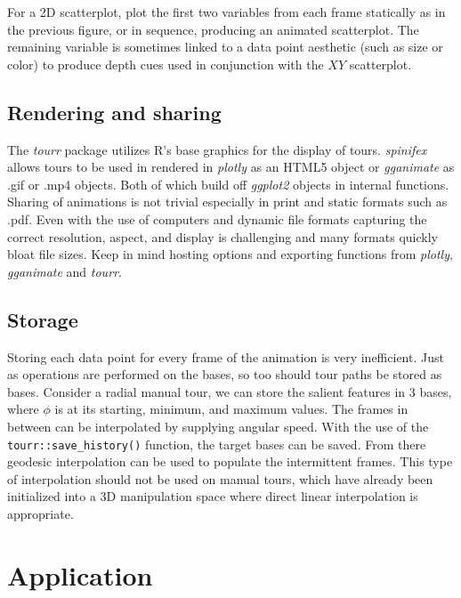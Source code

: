 \documentclass{monashthesis}
\theoremstyle{definition}
\theoremstyle{definition}
\theoremstyle{definition}
\theoremstyle{remark}
\begin{document}
For a 2D scatterplot, plot the first two variables from each frame
statically as in the previous figure, or in sequence, producing an
animated scatterplot. The remaining variable is sometimes linked to a
data point aesthetic (such as size or color) to produce depth cues used
in conjunction with the \(XY\) scatterplot.

\subsection{Rendering and sharing}\label{rendering-and-sharing}

The \emph{tourr} package utilizes R's base graphics for the display of
tours. \emph{spinifex} allows tours to be used in rendered in
\emph{plotly} \textcite{sievert_plotly_2018} as an HTML5 object or
\emph{gganimate} \textcite{pedersen_gganimate:_2019} as .gif or .mp4
objects. Both of which build off \emph{ggplot2} objects in internal
functions. Sharing of animations is not trivial especially in print and
static formats such as .pdf. Even with the use of computers and dynamic
file formats capturing the correct resolution, aspect, and display is
challenging and many formats quickly bloat file sizes. Keep in mind
hosting options and exporting functions from \emph{plotly},
\emph{gganimate} and \emph{tourr}.

\subsection{Storage}\label{storage}

Storing each data point for every frame of the animation is very
inefficient. Just as operations are performed on the bases, so too
should tour paths be stored as bases. Consider a radial manual tour, we
can store the salient features in 3 bases, where \(\phi\) is at its
starting, minimum, and maximum values. The frames in between can be
interpolated by supplying angular speed. With the use of the
\texttt{tourr::save\_history()} function, the target bases can be saved.
From there geodesic interpolation can be used to populate the
intermittent frames. This type of interpolation should not be used on
manual tours, which have already been initialized into a 3D manipulation
space where direct linear interpolation is appropriate.

\section{Application}\label{sec:application}
\end{document}
